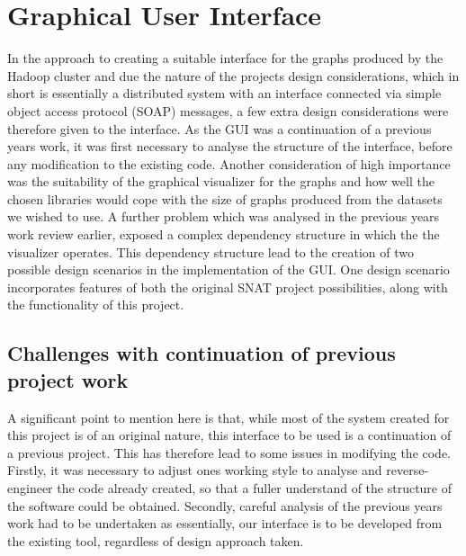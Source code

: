 \section{Graphical User Interface}
\label{sec:des_gui}

In the approach to creating a suitable interface for the graphs produced by the Hadoop cluster and due the nature of the projects design considerations, which in short is essentially a distributed system with an interface connected via simple object access protocol (SOAP) messages, a few extra design considerations were therefore given to the interface. As the GUI was a continuation of a previous years work, it was first necessary to analyse the structure of the interface, before any modification to the existing code. Another consideration of high importance was the suitability of the graphical visualizer for the graphs and how well the chosen libraries would cope with the size of graphs produced from the datasets we wished to use. A further problem which was analysed in the previous years work review earlier, exposed a complex dependency structure in which the the visualizer operates. This dependency structure lead to the creation of two possible design scenarios in the implementation of the GUI. One design scenario incorporates features of both the original SNAT project possibilities, along with the functionality of this project. 

\subsection{Challenges with continuation of previous project work}
A significant point to mention here is that, while most of the system created for this project is of an original nature, this interface to be used is a continuation of a previous project. This has therefore lead to some issues in modifying the code. Firstly, it was necessary to adjust ones working style to analyse and reverse-engineer the code already created, so that a fuller understand of the structure of the software could be obtained. Secondly, careful analysis of the previous years work had to be undertaken as essentially, our interface is to be developed from the existing tool, regardless of design approach taken. 

